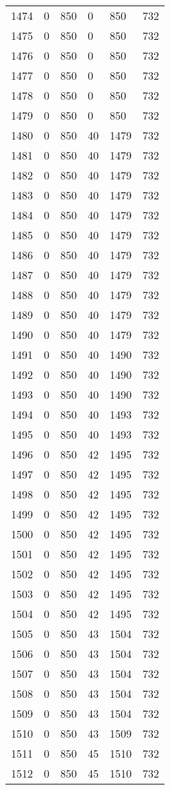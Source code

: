 \documentclass[a4paper]{ctexart}
\begin{document}
\begin{longtable}{p{1cm}|p{2cm}|p{2cm}|p{2cm}|P{2cm}|p{2cm}}
		1474&0&850&0&850&732\\
		1475&0&850&0&850&732\\
		1476&0&850&0&850&732\\
		1477&0&850&0&850&732\\
		1478&0&850&0&850&732\\
		1479&0&850&0&850&732\\
		1480&0&850&40&1479&732\\
		1481&0&850&40&1479&732\\
		1482&0&850&40&1479&732\\
		1483&0&850&40&1479&732\\
		1484&0&850&40&1479&732\\
		1485&0&850&40&1479&732\\
		1486&0&850&40&1479&732\\
		1487&0&850&40&1479&732\\
		1488&0&850&40&1479&732\\
		1489&0&850&40&1479&732\\
		1490&0&850&40&1479&732\\
		1491&0&850&40&1490&732\\
		1492&0&850&40&1490&732\\
		1493&0&850&40&1490&732\\
		1494&0&850&40&1493&732\\
		1495&0&850&40&1493&732\\
		1496&0&850&42&1495&732\\
		1497&0&850&42&1495&732\\
		1498&0&850&42&1495&732\\
		1499&0&850&42&1495&732\\
		1500&0&850&42&1495&732\\
		1501&0&850&42&1495&732\\
		1502&0&850&42&1495&732\\
		1503&0&850&42&1495&732\\
		1504&0&850&42&1495&732\\
		1505&0&850&43&1504&732\\
		1506&0&850&43&1504&732\\
		1507&0&850&43&1504&732\\
		1508&0&850&43&1504&732\\
		1509&0&850&43&1504&732\\
		1510&0&850&43&1509&732\\
		1511&0&850&45&1510&732\\
		1512&0&850&45&1510&732\\

\end{longtable}
\end{document}
